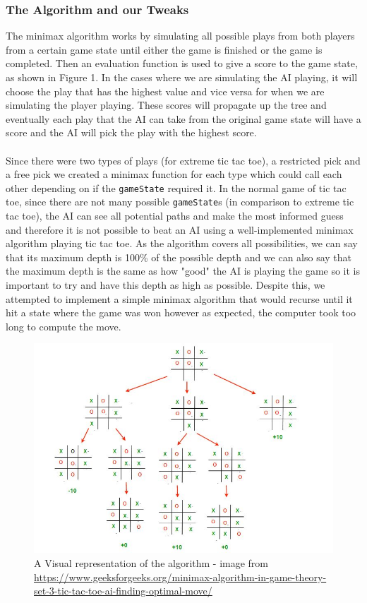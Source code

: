 \documentclass[11pt]{article}
\begin{document}
\subsubsection{The Algorithm and our Tweaks}
The minimax algorithm works by simulating all possible plays from both players from a certain game state until either the game is finished or the game is completed. Then an evaluation function is used to give a score to the game state, as shown in Figure 1. In the cases where we are simulating the AI playing, it will choose the play that has the highest value and vice versa for when we are simulating the player playing. These scores will propagate up the tree and eventually each play that the AI can take from the original game state will have a score and the AI will pick the play with the highest score.
\\\\Since there were two types of plays (for extreme tic tac toe), a restricted pick and a free pick we created a minimax function for each type which could call each other depending on if the {\tt{gameState}} required it. In the normal game of tic tac toe, since there are not many possible {\tt{gameState}}s (in comparison to extreme tic tac toe), the AI can see all potential paths and make the most informed guess and therefore it is not possible to beat an AI using a well-implemented minimax algorithm playing tic tac toe. As the algorithm covers all possibilities, we can say that its maximum depth is 100\% of the possible depth and we can also say that the maximum depth is the same as how "good" the AI is playing the game so it is important to try and have this depth as high as possible. Despite this, we attempted to implement a simple minimax algorithm that would recurse until it hit a state where the game was won however as expected, the computer took too long to compute the move.

\begin{figure}
	\includegraphics[scale = 0.5]{minimax.jpeg}
	\caption{A Visual representation of the algorithm - image from \url{https://www.geeksforgeeks.org/minimax-algorithm-in-game-theory-set-3-tic-tac-toe-ai-finding-optimal-move/}}
\end{figure}
\end{document}
